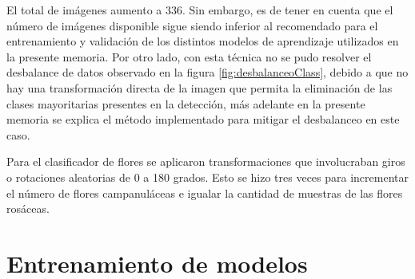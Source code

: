 El total de imágenes aumento a 336. Sin embargo, es de tener en cuenta que el número de imágenes disponible sigue siendo inferior al recomendado para el entrenamiento y validación de los distintos modelos de aprendizaje utilizados en la presente memoria. Por otro lado, con esta técnica no se pudo resolver el desbalance de datos observado en la figura \ref{fig:desbalanceoClass}, debido a que no hay una transformación directa de la imagen que permita la eliminación de las clases mayoritarias presentes en la detección, más adelante en la presente memoria se explica el método implementado para mitigar el desbalanceo en este caso. 

Para el clasificador de flores se aplicaron transformaciones que involucraban giros o rotaciones aleatorias de 0 a 180 grados. Esto se hizo tres veces para incrementar el número de flores campanuláceas e igualar la cantidad de muestras de las flores rosáceas.

\section{Entrenamiento de modelos}






